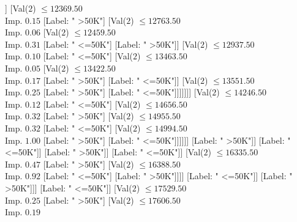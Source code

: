 \documentclass[margin=10pt]{standalone}
\begin{document}
\begin{forest}
																									[Label: " <=50K"]]
																								[Val($2$) $ \leq 12369.50$ \\ Imp. $0.15$
																									[Label: " >50K"]
																									[Val($2$) $ \leq 12763.50$ \\ Imp. $0.06$
																										[Val($2$) $ \leq 12459.50$ \\ Imp. $0.31$
																											[Label: " <=50K"]
																											[Label: " >50K"]]
																										[Val($2$) $ \leq 12937.50$ \\ Imp. $0.10$
																											[Label: " <=50K"]
																											[Val($2$) $ \leq 13463.50$ \\ Imp. $0.05$
																												[Val($2$) $ \leq 13422.50$ \\ Imp. $0.17$
																													[Label: " >50K"]
																													[Label: " <=50K"]]
																												[Val($2$) $ \leq 13551.50$ \\ Imp. $0.25$
																													[Label: " >50K"]
																													[Label: " <=50K"]]]]]]]
																							[Val($2$) $ \leq 14246.50$ \\ Imp. $0.12$
																								[Label: " <=50K"]
																								[Val($2$) $ \leq 14656.50$ \\ Imp. $0.32$
																									[Label: " >50K"]
																									[Val($2$) $ \leq 14955.50$ \\ Imp. $0.32$
																										[Label: " <=50K"]
																										[Val($2$) $ \leq 14994.50$ \\ Imp. $1.00$
																											[Label: " >50K"]
																											[Label: " <=50K"]]]]]]
																						[Label: " >50K"]]
																					[Label: " <=50K"]]
																				[Label: " >50K"]]
																			[Label: " <=50K"]]
																		[Val($2$) $ \leq 16335.50$ \\ Imp. $0.47$
																			[Label: " >50K"]
																			[Val($2$) $ \leq 16388.50$ \\ Imp. $0.92$
																				[Label: " <=50K"]
																				[Label: " >50K"]]]]
																	[Label: " <=50K"]]
																[Label: " >50K"]]]
														[Label: " <=50K"]]
													[Val($2$) $ \leq 17529.50$ \\ Imp. $0.25$
														[Label: " >50K"]
														[Val($2$) $ \leq 17606.50$ \\ Imp. $0.19$

\end{forest}
\end{document}
